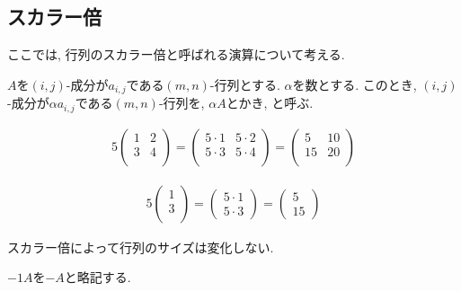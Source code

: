 \subsection{スカラー倍}
ここでは, 行列のスカラー倍と呼ばれる演算について考える.
\begin{definition}
  \label{def:op:scalar}
  $A$を$(i,j)$-成分が$a_{i,j}$である$(m,n)$-行列とする.
  $\alpha$を数とする.
  このとき,
  $(i,j)$-成分が$\alpha a_{i,j}$である$(m,n)$-行列を,
  $\alpha A$とかき,
  と呼ぶ.
\end{definition}
\begin{example}
  \begin{align*}
  5
  \begin{pmatrix}
    1&2\\
    3&4\\
  \end{pmatrix}
  =
  \begin{pmatrix}
    5\cdot 1&5\cdot 2\\
    5\cdot 3&5\cdot 4\\
  \end{pmatrix}
  =
  \begin{pmatrix}
    5&10\\
    15&20\\
  \end{pmatrix}
  \end{align*}
\end{example}

\begin{example}
  \begin{align*}
  5
  \begin{pmatrix}
    1\\
    3\\
  \end{pmatrix}
  =
  \begin{pmatrix}
    5\cdot 1\\
    5\cdot 3
  \end{pmatrix}
  =
  \begin{pmatrix}
    5\\
    15
  \end{pmatrix}
  \end{align*}
\end{example}
\begin{remark}
  スカラー倍によって行列のサイズは変化しない.
\end{remark}
\begin{definition}
  $-1A$を$-A$と略記する.
\end{definition}

